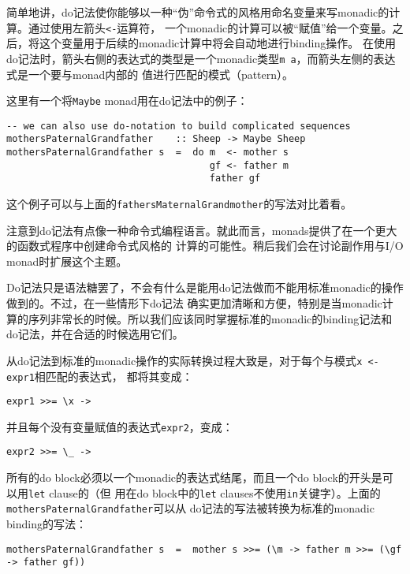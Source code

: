 \indent{}简单地讲，do记法使你能够以一种“伪”命令式的风格用命名变量来写monadic的计算。通过使用左箭头\texttt{<-}运算符，
一个monadic的计算可以被“赋值”给一个变量。之后，将这个变量用于后续的monadic计算中将会自动地进行binding操作。
在使用do记法时，箭头右侧的表达式的类型是一个monadic类型\texttt{m a}，而箭头左侧的表达式是一个要与monad内部的
值进行匹配的模式（pattern）。

\indent{}这里有一个将\texttt{Maybe} monad用在do记法中的例子：
\begin{verbatim}
-- we can also use do-notation to build complicated sequences
mothersPaternalGrandfather    :: Sheep -> Maybe Sheep
mothersPaternalGrandfather s  =  do m  <- mother s
                                    gf <- father m
                                    father gf
\end{verbatim}
\noindent{}这个例子可以与上面的\texttt{fathersMaternalGrandmother}的写法对比着看。

\indent{}注意到do记法有点像一种命令式编程语言。就此而言，monads提供了在一个更大的函数式程序中创建命令式风格的
计算的可能性。稍后我们会在讨论副作用与I/O monad时扩展这个主题。

\indent{}Do记法只是语法糖罢了，不会有什么是能用do记法做而不能用标准monadic的操作做到的。不过，在一些情形下do记法
确实更加清晰和方便，特别是当monadic计算的序列非常长的时候。所以我们应该同时掌握标准的monadic的binding记法和
do记法，并在合适的时候选用它们。

\indent{}从do记法到标准的monadic操作的实际转换过程大致是，对于每个与模式\texttt{x <- expr1}相匹配的表达式，
都将其变成：
\begin{verbatim}
expr1 >>= \x ->
\end{verbatim}
\noindent{}并且每个没有变量赋值的表达式\texttt{expr2}，变成：
\begin{verbatim}
expr2 >>= \_ ->
\end{verbatim}
\noindent{}所有的do block必须以一个monadic的表达式结尾，而且一个do block的开头是可以用\texttt{let} clause的（但
用在do block中的\texttt{let} clauses不使用\texttt{in}关键字）。上面的\texttt{mothersPaternalGrandfather}可以从
do记法的写法被转换为标准的monadic binding的写法：
\begin{verbatim}
mothersPaternalGrandfather s  =  mother s >>= (\m -> father m >>= (\gf -> father gf))
\end{verbatim}

